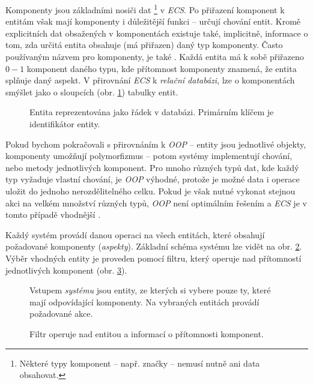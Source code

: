 Komponenty jsou základními nosiči dat \footnote{Některé typy komponent -- např. značky -- nemusí nutně ani data obsahovat.} v \emph{ECS}. Po přiřazení komponent k entitám však mají komponenty i důležitější funkci -- určují chování entit. Kromě explicitních dat obsažených v komponentách existuje také, implicitně, informace o tom, zda určitá entita obsahuje (má přiřazen) daný typ komponenty. Často používaným názvem pro komponenty, je také  \cite{EntitySystemsFuture}. Každá entita má k sobě přiřazeno $0-1$ komponent daného typu, kde přítomnost komponenty znamená, že entita splňuje daný aspekt. V přirovnání \emph{ECS} k \emph{relační databázi}, lze o komponentách smýšlet jako o sloupcích (obr. \ref{Fig:ECSDB}) tabulky entit.

\begin{figure}
	\caption{Entita reprezentována jako řádek v databázi. Primárním klíčem je identifikátor entity.}
	\label{Fig:ECSDB}
\end{figure}

Pokud bychom pokračovali s přirovnáním k \emph{OOP} -- entity jsou jednotlivé objekty, komponenty umožňují polymorfizmus -- potom systémy implementují chování, nebo metody jednotlivých komponent. Pro mnoho různých typů dat, kde každý typ vyžaduje vlastní chování, je \emph{OOP} výhodné, protože je možné data i operace uložit do jednoho nerozdělitelného celku. Pokud je však nutné vykonat stejnou akci na velkém množství různých typů, \emph{OOP} není optimálním řešením a \emph{ECS} je v tomto případě vhodnější \cite{EntitySystemsFuture}. 

Každý systém provádí danou operaci na všech entitách, které obsahují požadované komponenty (\emph{aspekty}). Základní schéma systému lze vidět na obr. \ref{Fig:ECSSystem}. Výběr vhodných entity je proveden pomocí filtru, který operuje nad přítomností jednotlivých komponent (obr. \ref{Fig:ECSFilter}).

\begin{figure}[H]
	\caption{Vstupem \emph{systému} jsou entity, ze kterých si vybere pouze ty, které mají odpovídající komponenty. Na vybraných entitách provádí požadované akce.}
	\label{Fig:ECSSystem}
\end{figure}
\begin{figure}[H]
	\caption{Filtr operuje nad entitou a informací o přítomnosti komponent.}
	\label{Fig:ECSFilter}
\end{figure}

